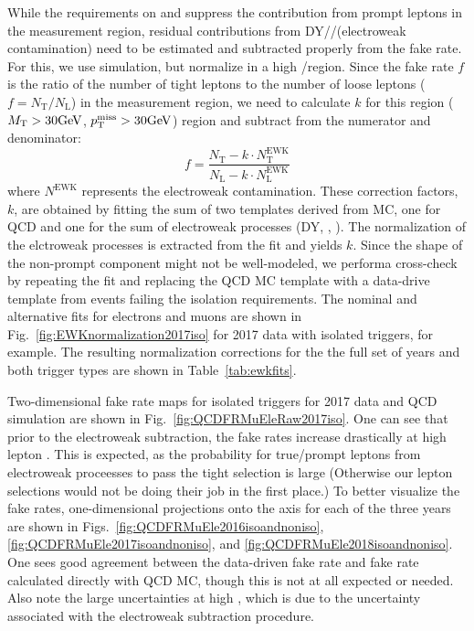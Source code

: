 While the requirements on \ptmiss and \MT suppress the
contribution from prompt leptons in the measurement region,
residual contributions from DY/\wjets/\ttjets (electroweak contamination)
need to be estimated and subtracted properly from the fake rate.
For this, we use simulation, but normalize in a high \MT/\ptmiss region.
Since the fake rate $f$ is the ratio of the number of tight leptons
to the number of loose leptons ($f=N_\mathrm{T}/N_\mathrm{L}$)
in the measurement region, we need to calculate $k$ for this region
($M_{\mathrm{T}}>30\text{GeV}$, $p_{\mathrm{T}}^\text{miss}>30\text{GeV}$) 
region and subtract from the numerator and denominator:
\begin{equation}
  f = \frac{N_\mathrm{T} - k \cdot N_\mathrm{T}^\text{EWK}}{N_\mathrm{L} - k \cdot N_\mathrm{L}^\text{EWK}}
\end{equation}
where $N^\text{EWK}$ represents the electroweak contamination.
These correction factors, $k$, are obtained by fitting the sum of two templates
derived from MC, one for QCD and one for the sum of electroweak processes
(DY, \wjets, \ttjets). The normalization of the elctroweak processes is extracted
from the fit and yields $k$. Since the shape of the non-prompt component
might not be well-modeled, we performa cross-check by repeating the fit and replacing the QCD
MC template with a data-drive template from events failing the isolation requirements.
The nominal and alternative fits for electrons and muons are shown in 
Fig.~\ref{fig:EWKnormalization2017iso} for 2017 data with isolated triggers, for example.
The resulting normalization corrections for the the full set of years and both trigger types
are shown in Table~\ref{tab:ewkfits}.

Two-dimensional fake rate maps for isolated triggers for 2017 data and QCD simulation
are shown in Fig.~\ref{fig:QCDFRMuEleRaw2017iso}.
One can see that prior to the electroweak subtraction, the fake rates increase drastically
at high lepton \pt. This is expected, as the probability for true/prompt leptons
from electroweak proceesses to pass the tight selection is large (Otherwise our lepton
selections would not be doing their job in the first place.)
To better visualize the fake rates, 
one-dimensional projections onto the \ptcorr axis for each of the three years
are shown in Figs.~\ref{fig:QCDFRMuEle2016isoandnoniso}, \ref{fig:QCDFRMuEle2017isoandnoniso},
and \ref{fig:QCDFRMuEle2018isoandnoniso}. One sees good agreement between
the data-driven fake rate and fake rate calculated directly with QCD MC, though
this is not at all expected or needed. Also note the large uncertainties at high \ptcorr,
which is due to the uncertainty associated with the electroweak subtraction procedure.


